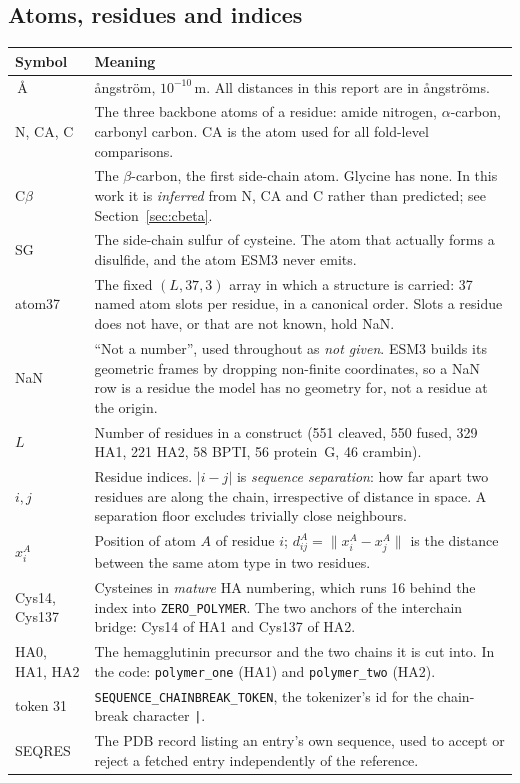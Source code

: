 \documentclass[11pt,a4paper]{article}
\newcommand{\ang}{\,\mbox{\AA}}
\begin{document}
\subsection{Atoms, residues and indices}

\begin{center}
\small
\begin{tabular}{@{}lp{11.8cm}@{}}
\toprule
Symbol & Meaning \\
\midrule
$\ang$ & \aa ngstr\"om, $10^{-10}\,$m. All distances in this report are in
  \aa ngstr\"oms. \\
N, CA, C & The three backbone atoms of a residue: amide nitrogen, $\alpha$-carbon,
  carbonyl carbon. CA is the atom used for all fold-level comparisons. \\
C$\beta$ & The $\beta$-carbon, the first side-chain atom. Glycine has none. In
  this work it is \emph{inferred} from N, CA and C rather than predicted; see
  Section~\ref{sec:cbeta}. \\
SG & The side-chain sulfur of cysteine. The atom that actually forms a
  disulfide, and the atom ESM3 never emits. \\
atom37 & The fixed $(L, 37, 3)$ array in which a structure is carried: 37 named
  atom slots per residue, in a canonical order. Slots a residue does not have,
  or that are not known, hold NaN. \\
NaN & ``Not a number'', used throughout as \emph{not given}. ESM3 builds its
  geometric frames by dropping non-finite coordinates, so a NaN row is a
  residue the model has no geometry for, not a residue at the origin. \\
$L$ & Number of residues in a construct (551 cleaved, 550 fused, 329 HA1,
  221 HA2, 58 BPTI, 56 protein~G, 46 crambin). \\
$i,j$ & Residue indices. $|i-j|$ is \emph{sequence separation}: how far apart
  two residues are along the chain, irrespective of distance in space. A
  separation floor excludes trivially close neighbours. \\
$x_i^{A}$ & Position of atom $A$ of residue $i$; $d^{A}_{ij} =
  \lVert x_i^{A} - x_j^{A}\rVert$ is the distance between the same atom type in
  two residues. \\
Cys14, Cys137 & Cysteines in \emph{mature} HA numbering, which runs 16 behind
  the index into \texttt{ZERO\_POLYMER}. The two anchors of the interchain
  bridge: Cys14 of HA1 and Cys137 of HA2. \\
HA0, HA1, HA2 & The hemagglutinin precursor and the two chains it is cut into.
  In the code: \texttt{polymer\_one} (HA1) and \texttt{polymer\_two} (HA2). \\
token 31 & \texttt{SEQUENCE\_CHAINBREAK\_TOKEN}, the tokenizer's id for the
  chain-break character \texttt{|}. \\
SEQRES & The PDB record listing an entry's own sequence, used to accept or
  reject a fetched entry independently of the reference. \\
\bottomrule
\end{tabular}
\end{center}
\end{document}
